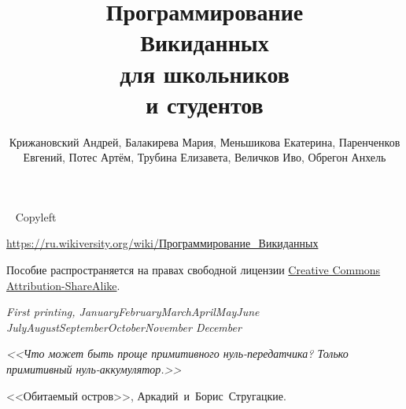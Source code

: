 \documentclass[nofonts,justified,nobib]{tufte-book}%
\title{Программирование \\Викиданных \\для школьников \\и студентов}
\author[Крижановский и др.]{Крижановский Андрей, Балакирева Мария, Меньшикова Екатерина, Паренченков Евгений, Потес Артём, Трубина Елизавета, Величков Иво, Обрегон Анхель}
\theoremstyle{definition}
\newcommand{\monthyear}{%
  \ifcase\month\or January\or February\or March\or April\or May\or June\or
  July\or August\or September\or October\or November\or
  December\fi\space\number\year
}
\newcommand{\openepigraph}[2]{%
  \begin{fullwidth}
  \sffamily\large
  \begin{doublespace}
  \noindent\allcaps{#1}\\%
  \noindent\allcaps{#2}%
  \end{doublespace}
  \end{fullwidth}
}
\newcommand{\blankpage}{\newpage\hbox{}\thispagestyle{empty}\newpage}
\begin{document}




\maketitle


\newpage
\begin{fullwidth}
~\vfill
\thispagestyle{empty}
\setlength{\parindent}{0pt}
\setlength{\parskip}{\baselineskip}
Copyleft \textcopyleft\ \the\year\ \thanklessauthor

\par{}

\par\href{https://w.wiki/62E}{https://ru.wikiversity.org/wiki/Программирование\_Викиданных}

\par Пособие распространяется на правах свободной лицензии 
    \href{https://creativecommons.org/licenses/by-sa/4.0/deed.ru}{Creative Commons Attribution-ShareAlike}.


\par\textit{First printing, \monthyear}
\end{fullwidth}

\tableofcontents

\listoffigures

\listoftables

\clearpage
\vfill
\begin{fullwidth}
\begin{doublespace}
\noindent\fontsize{18}{22}\selectfont\itshape
\nohyphenation
<<Что может быть проще примитивного нуль-передатчика? Только примитивный нуль-аккумулятор.>>

<<Обитаемый остров>>, \mbox{Аркадий и Борис Стругацкие}.
\end{doublespace}
\end{fullwidth}
\end{document}
